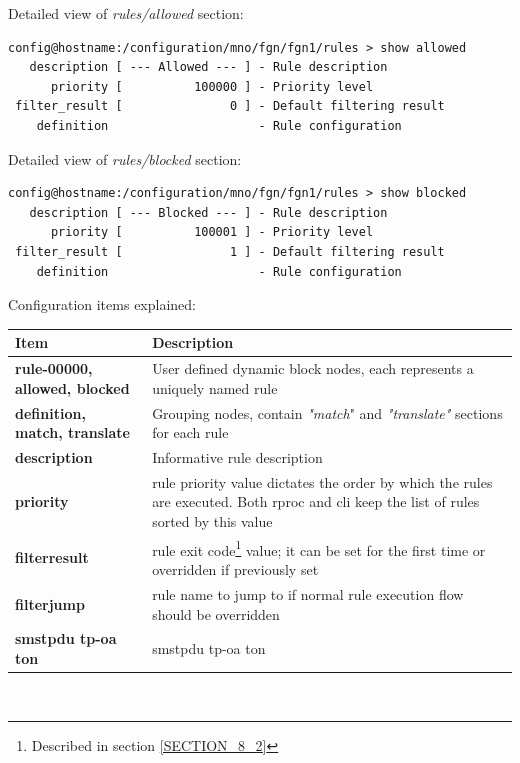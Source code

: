 \documentclass[a4paper,latin]{paper}
\begin{document}
Detailed view of \textit{rules/allowed} section:
\begin{lstlisting}[style=BashInputStyle, belowskip=\baselineskip]
config@hostname:/configuration/mno/fgn/fgn1/rules > show allowed
   description [ --- Allowed --- ] - Rule description
      priority [          100000 ] - Priority level  
 filter_result [               0 ] - Default filtering result
    definition                     - Rule configuration
\end{lstlisting}
\clearpage
\noindent{}Detailed view of \textit{rules/blocked} section:
\begin{lstlisting}[style=BashInputStyle, belowskip=\baselineskip]
config@hostname:/configuration/mno/fgn/fgn1/rules > show blocked
   description [ --- Blocked --- ] - Rule description
      priority [          100001 ] - Priority level  
 filter_result [               1 ] - Default filtering result
    definition                     - Rule configuration
\end{lstlisting}
\noindent{}Configuration items explained:\\
\begin{tabularx}{\textwidth}{ | l | X |}
	\hline
	Item	 				& Description \\
	\hline
	\textbf{rule-00000, allowed, blocked}	& User defined dynamic block nodes, each represents a uniquely named \gls{rule} \\
	\textbf{definition, match, translate}	& Grouping nodes, contain \textit{"match}" and \textit{"translate"} sections for each \gls{rule}  \\
	\textbf{description}			& Informative \gls{rule} description \\
	\textbf{priority}			& \Gls{rule} priority value dictates the order by which the \glspl{rule} are executed. Both \acrlong{rproc} and 
						  \acrlong{cli} keep the list of \glspl{rule} sorted by this value \\
	\textbf{filter\textunderscore{}result}	& \Gls{rule} exit code\footnote{Described in section \ref{SECTION_8_2}} value; it can be set for the first 
						  time or overridden if  previously set \\
	\textbf{filter\textunderscore{}jump}	& \Gls{rule} name to jump to if normal \gls{rule} execution flow should be overridden \\
	\textbf{smstpdu tp-oa ton}		& \acrshort{smstpdu} \acrfull{tp-oa} \acrfull{ton} \\
	\hline
\end{tabularx}\\
\end{document}
